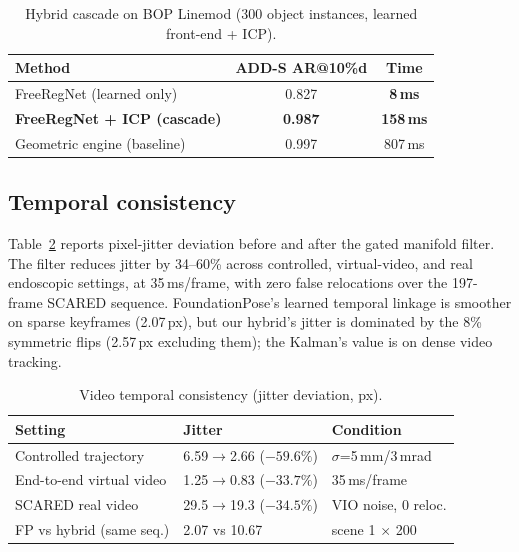 \documentclass[9pt,twoside,web]{ieeecolor2}
\begin{document}
\begin{table}[t]
\centering
\caption{Hybrid cascade on BOP Linemod (300 object instances, learned front-end + ICP).}
\label{tab:cascade}
\begin{tabular}{lcc}
\toprule
Method & ADD-S AR@10\%d & Time \\
\midrule
FreeRegNet (learned only) & 0.827 & \textbf{8\,ms} \\
\textbf{FreeRegNet + ICP (cascade)} & \textbf{0.987} & \textbf{158\,ms} \\
Geometric engine (baseline) & 0.997 & 807\,ms \\
\bottomrule
\end{tabular}
\end{table}

\subsection{Temporal consistency}
Table~\ref{tab:temporal} reports pixel-jitter deviation before and after the gated manifold filter. The filter reduces jitter by 34--60\% across controlled, virtual-video, and real endoscopic settings, at 35\,ms/frame, with zero false relocations over the 197-frame SCARED sequence. FoundationPose's learned temporal linkage is smoother on sparse keyframes (2.07\,px), but our hybrid's jitter is dominated by the 8\% symmetric flips (2.57\,px excluding them); the Kalman's value is on dense video tracking.

\begin{table}[t]
\centering
\caption{Video temporal consistency (jitter deviation, px).}
\label{tab:temporal}
\begin{tabular}{lll}
\toprule
Setting & Jitter & Condition \\
\midrule
Controlled trajectory & 6.59$\to$2.66 ($-59.6\%$) & $\sigma$=5\,mm/3\,mrad \\
End-to-end virtual video & 1.25$\to$0.83 ($-33.7\%$) & 35\,ms/frame \\
SCARED real video & 29.5$\to$19.3 ($-34.5\%$) & VIO noise, 0 reloc. \\
FP vs hybrid (same seq.) & 2.07 vs 10.67 & scene 1 $\times$ 200 \\
\bottomrule
\end{tabular}
\end{table}
\end{document}
